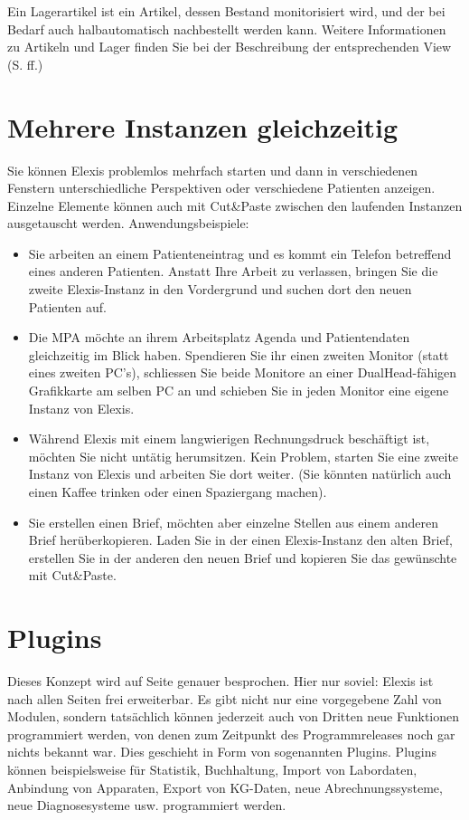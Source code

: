  Ein Lagerartikel ist ein Artikel, dessen Bestand monitorisiert wird, und der bei Bedarf auch halbautomatisch nachbestellt werden kann.
 Weitere Informationen zu Artikeln und Lager finden Sie bei der Beschreibung der entsprechenden View (S. \pageref{view:artikel} ff.)

 \section{Mehrere Instanzen gleichzeitig}
 Sie können Elexis problemlos mehrfach starten und dann in verschiedenen
 Fenstern unterschiedliche Perspektiven oder verschiedene Patienten anzeigen.
 Einzelne Elemente können auch mit Cut\&Paste zwischen den laufenden Instanzen
 ausgetauscht werden.
 Anwendungsbeispiele:
 \begin{itemize}
   \item Sie arbeiten an einem Patienteneintrag und es kommt ein Telefon
   betreffend eines anderen Patienten. Anstatt Ihre Arbeit zu verlassen, bringen
   Sie die zweite Elexis-Instanz in den Vordergrund und suchen dort den neuen
   Patienten auf.
   \item Die MPA möchte an ihrem Arbeitsplatz Agenda und Patientendaten
   gleichzeitig im Blick haben. Spendieren Sie ihr einen zweiten Monitor (statt
   eines zweiten PC's), schliessen Sie beide Monitore an einer DualHead-fähigen
   Grafikkarte am selben PC an und schieben Sie in jeden Monitor eine eigene
   Instanz von Elexis.
   \item Während Elexis mit einem langwierigen Rechnungsdruck beschäftigt ist,
   möch\-ten Sie nicht untätig herumsitzen. Kein Problem, starten Sie eine zweite
   Instanz von Elexis und arbeiten Sie dort weiter. (Sie könnten natürlich auch
   einen Kaffee trinken oder einen Spaziergang machen).
   \item Sie erstellen einen Brief, möchten aber einzelne Stellen aus einem
   anderen Brief herüberkopieren. Laden Sie in der einen Elexis-Instanz den
   alten Brief, erstellen Sie in der anderen den neuen Brief und kopieren Sie
   das gewünschte mit Cut\&Paste.
 \end{itemize}

\section{Plugins}
Dieses Konzept wird auf Seite \pageref{expl:plugins} genauer besprochen. Hier nur soviel: Elexis ist nach allen Seiten frei erweiterbar. Es gibt nicht nur eine vorgegebene Zahl von \glqq Modulen\grqq{}, sondern tatsächlich können jederzeit auch von Dritten neue Funktionen programmiert werden, von denen zum Zeitpunkt des Programmreleases noch gar nichts bekannt war. Dies geschieht in Form von sogenannten \glqq Plugins\grqq{}. Plugins können beispielsweise für Statistik, Buchhaltung, Import von Labordaten, Anbindung von Apparaten, Export von KG-Daten, neue Abrechnungssysteme, neue Diagnosesysteme usw. programmiert werden.

